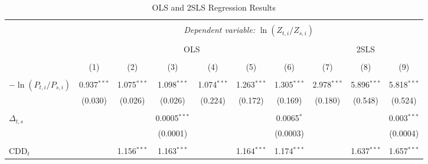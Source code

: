\documentclass[11pt,a4paper,leqno]{extarticle}
\begin{document}
	\begin{landscape}
		
		\begin{table}[!h] \centering 
			\caption{OLS and 2SLS Regression Results }
			\label{table:regresults} 
			\small
			\begin{tabular}{@{\extracolsep{5pt}}lccccccccc} 
				\\[-4ex]\hline  
				\hline \\[-1.8ex] 
				& \multicolumn{9}{c}{\textit{Dependent variable:} $\ln (Z_{ t, i} / Z_{ s, i})$} \\ [0.5ex]
				\cline{2-10} \\ [-1.5ex]
				& \multicolumn{6}{c}{ OLS}   & \multicolumn{3}{c}{ 2SLS} \\ [0.5ex]
				\cline{2-7} \cline{8-10} 
				\\[-1.8ex] & (1) & (2) & (3) & (4) & (5) & (6) & (7) & (8) & (9) \\ [0.5ex]
				\hline \\[-1.8ex] 
				$-\ln (P_{t,i} / P_{s,i})$ & 0.937$^{***}$ & 1.075$^{***}$ & 1.098$^{***}$ & 1.074$^{***}$ & 1.263$^{***}$ & 1.305$^{***}$  & 2.978$^{***}$ & 5.896$^{***}$ & 5.818$^{***}$ \\ 
				& (0.030) & (0.026) & (0.026) & (0.224) & (0.172) & (0.169) & (0.180) & (0.548) & (0.524) \\ 
				& & & & & & \\ 
				$\Delta_{t,s}$ &  &  & 0.0005$^{***}$ &  &  & 0.0065$^{*}$ &  &  & 0.003$^{***}$ \\ 
				&  &  & (0.0001) &  &  & (0.0003)  &  &  & (0.0004) \\ 
				& & & & & & \\ 
				CDD$_t$ &  & 1.156$^{***}$ & 1.163$^{***}$ &  & 1.164$^{***}$ & 1.174$^{***}$  &  & 1.637$^{***}$ & 1.657$^{***}$ \\ 
				

\end{tabular}
\end{table}
\end{landscape}
\end{document}
